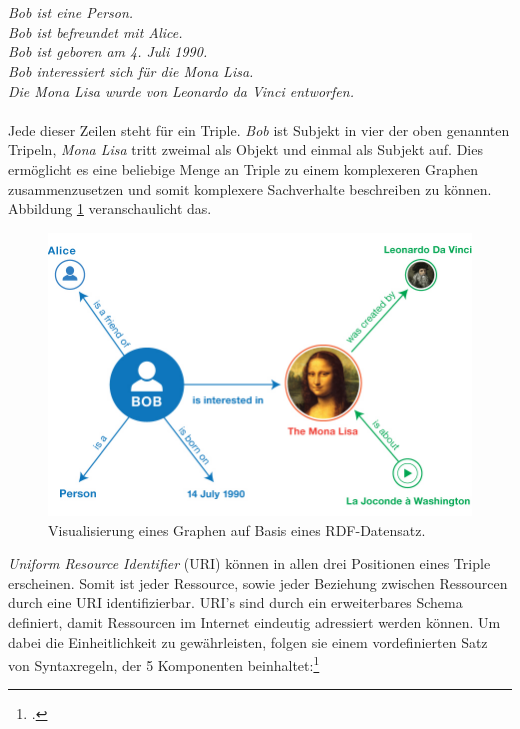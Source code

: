 \documentclass[12pt,a4paper]{article}
\begin{document}
\\
\\
\textit{Bob ist eine Person.\\
Bob ist befreundet mit Alice.\\
Bob ist geboren am 4. Juli 1990. \\
Bob interessiert sich für die Mona Lisa.\\
Die Mona Lisa wurde von Leonardo da Vinci entworfen.}
\\
\\
Jede dieser Zeilen steht für ein Triple. \textit{Bob} ist Subjekt in vier der oben genannten Tripeln, \textit{Mona Lisa} tritt zweimal als Objekt und einmal als Subjekt auf. Dies ermöglicht es eine beliebige Menge an Triple zu einem komplexeren Graphen zusammenzusetzen und somit komplexere Sachverhalte beschreiben zu können. Abbildung \ref{fig:rdf_example} veranschaulicht das.
\begin{figure}[h]
  \centering
	\includegraphics[width=1\textwidth]{img/rdf_example.png}  
    \caption[Visualisierung eines Graphen auf Basis eines RDF-Datensatz, \protect\url{https://www.w3.org/TR/rdf11-primer/}, 10.04.2019.]{Visualisierung eines Graphen auf Basis eines RDF-Datensatz.}
  	\label{fig:rdf_example}
\end{figure}
\textit{Uniform Resource Identifier} (URI) können in allen drei Positionen eines Triple erscheinen. Somit ist jeder Ressource, sowie jeder Beziehung zwischen Ressourcen durch eine URI identifizierbar. URI's sind durch ein erweiterbares Schema definiert, damit Ressourcen im Internet eindeutig adressiert werden können. Um dabei die Einheitlichkeit zu gewährleisten, folgen sie einem vordefinierten Satz von Syntaxregeln, der 5 Komponenten beinhaltet:\footcite[Vgl.][]{berners2004uniform}
\end{document}
